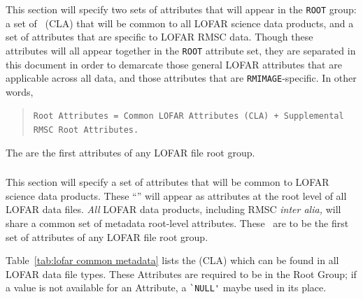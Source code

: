 \documentclass[a4paper,10pt,bibtotoc]{scrartcl}
\begin{document}
This section will specify two sets of attributes that will appear in the \texttt{ROOT} group: a set of \cla\ (CLA) that will be common to all LOFAR science data products, and a set of attributes that are specific to LOFAR RMSC data.  Though these attributes will all appear together in the \texttt{ROOT} attribute set, they are separated in this document in order to demarcate those general LOFAR attributes that are applicable across all data, and those attributes that are \texttt{RMIMAGE}-specific.
In other words,

\begin{verse}
  \verb|Root Attributes = Common LOFAR Attributes (CLA) + Supplemental RMSC Root Attributes.|
\end{verse}

The {\cla} are the first attributes of any LOFAR file root group.


\subsubsection{\cla}
\label{sec:common lofar attributes}

This section will specify a set of attributes that will be common to
LOFAR science data products.  These ``\cla'' will
appear as attributes at the root level of all LOFAR data files.
\textit{All} LOFAR data products, including RMSC \textit{inter
  alia,} will share a common set of metadata root-level attributes.
These \cla\ are to be the first set of attributes of
any LOFAR file root group.

Table~\ref{tab:lofar common metadata} lists the {\cla} (CLA) which can be found in all LOFAR data file types.  These Attributes are required to be in the Root Group; if a value is not available for an Attribute, a \verb|`NULL'| maybe used in its place.\\


\end{document}
